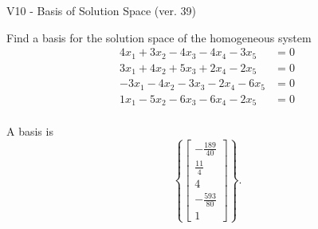 \begin{exercise}
  \begin{exerciseTitle}V10 - Basis of Solution Space (ver. 39)\end{exerciseTitle}
  \begin{exerciseStatement}
    Find a basis for the solution space of the homogeneous system 
\begin{align*}
 4 x_ 1 + 3 x_ 2 -4 x_ 3 -4 x_ 4 -3 x_ 5 &= 0  \\ 
  3 x_ 1 + 4 x_ 2 + 5 x_ 3 + 2 x_ 4 -2 x_ 5 &= 0  \\ 
  -3 x_ 1 -4 x_ 2 -3 x_ 3 -2 x_ 4 -6 x_ 5 &= 0  \\ 
  1 x_ 1 -5 x_ 2 -6 x_ 3 -6 x_ 4 -2 x_ 5 &= 0  \\ 
 \end{align*}


 
  \end{exerciseStatement}

  \begin{exerciseAnswer}
   A basis is   
\[\left\{\left[\begin{array}{c}
-\frac{189}{40} \\
\frac{11}{4} \\
4 \\
-\frac{593}{80} \\
1
\end{array}\right]\right\}.\]

  


  \end{exerciseAnswer}
\end{exercise}